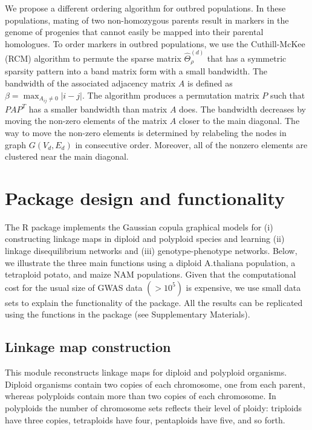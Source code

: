 We propose a different ordering algorithm for outbred populations. In these populations, mating of two non-homozygous parents result in markers in the genome of progenies that cannot easily be mapped into their parental homologues. %
To order markers in outbred populations, we use the Cuthill-McKee (RCM) algorithm \citep{cuthill1969reducing} to permute the sparse matrix  $\widehat{\Theta}_\rho^{(d)}$ that has a symmetric sparsity pattern into a band matrix form with a small bandwidth. The bandwidth of the associated adjacency matrix $A$ is defined as $\beta = \max_ {A_{ij} \ne 0} | i - j|$. The algorithm produces a permutation matrix $P$ such that $P A P^T$ has a smaller bandwidth than matrix $A$ does. The bandwidth decreases by moving the non-zero elements of the matrix $A$ closer to the main diagonal. The way to move the non-zero elements is determined by relabeling the nodes in graph $G(V_d, E_d)$ in consecutive order. Moreover, all of the nonzero elements are clustered near the main diagonal.%


\section{Package design and functionality}
\label{interface}
The  R package implements the Gaussian copula graphical models \citep{behrouzi2019detecting} for (i) constructing linkage maps in diploid and polyploid species and learning (ii) linkage disequilibrium networks and (iii) genotype-phenotype networks. Below, we illustrate the three main functions using a diploid A.thaliana population, a tetraploid potato, and maize NAM populations. Given that the computational cost for the usual size of GWAS data $( > 10^5)$ is expensive, we use small data sets to explain the functionality of the package. All the results can be replicated using the functions in the  package (see Supplementary Materials).

\subsection{Linkage map construction}
\label{map}
This module reconstructs linkage maps for diploid and polyploid organisms. Diploid organisms contain two copies of each chromosome, one from each parent, whereas polyploids contain more than two copies of each chromosome. In polyploids the number of chromosome sets reflects their level of ploidy: triploids have three copies, tetraploids have four, pentaploids have five, and so forth. 

